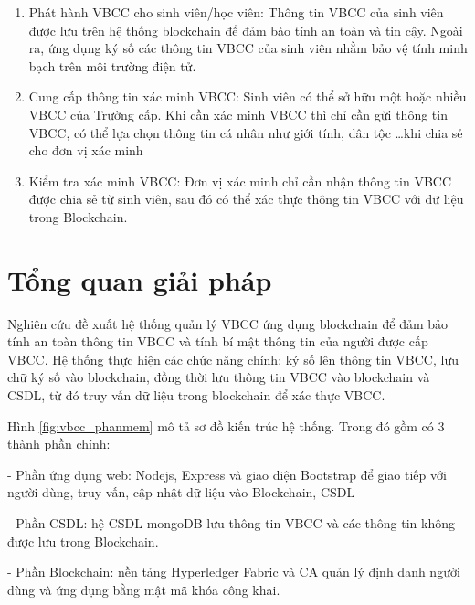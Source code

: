 \begin{enumerate}
\item Phát hành VBCC cho sinh viên/học viên:
Thông tin VBCC của sinh viên được lưu trên hệ thống blockchain để đảm bào tính an toàn và tin cậy. Ngoài ra, ứng dụng ký số các thông tin VBCC của sinh viên nhằm bảo vệ tính minh bạch trên môi trường điện tử.

\item Cung cấp thông tin xác minh VBCC:
Sinh viên có thể sở hữu một hoặc nhiều VBCC của Trường cấp. Khi cần xác minh VBCC thì chỉ cần gửi thông tin VBCC, có thể lựa chọn thông tin cá nhân như giới tính, dân tộc \ldots khi chia sẻ cho đơn vị xác minh

\item Kiểm tra xác minh VBCC:
Đơn vị xác minh chỉ cần nhận thông tin VBCC được chia sẻ từ sinh viên, sau đó có thể xác thực thông tin VBCC với dữ liệu trong Blockchain.

\end{enumerate}

\section{Tổng quan giải pháp}

Nghiên cứu đề xuất hệ thống quản lý VBCC ứng dụng blockchain để đảm bảo tính an toàn thông tin VBCC và tính bí mật thông tin của người được cấp VBCC.
Hệ thống thực hiện các chức năng chính: ký số lên thông tin VBCC, lưu chữ ký số vào blockchain, đồng thời lưu thông tin VBCC vào blockchain và CSDL, từ đó truy vấn dữ liệu trong blockchain để xác thực VBCC. 

Hình \ref{fig:vbcc_phanmem} mô tả sơ đồ kiến trúc hệ thống. Trong đó gồm có 3 thành phần chính:

- Phần ứng dụng web: Nodejs, Express và giao diện Bootstrap để giao tiếp với người dùng, truy vấn, cập nhật dữ liệu vào Blockchain, CSDL

- Phần CSDL: hệ CSDL mongoDB lưu thông tin VBCC và các thông tin không được lưu trong Blockchain.

- Phần Blockchain: nền tảng Hyperledger Fabric và CA quản lý định danh người dùng và ứng dụng bằng mật mã khóa công khai.

